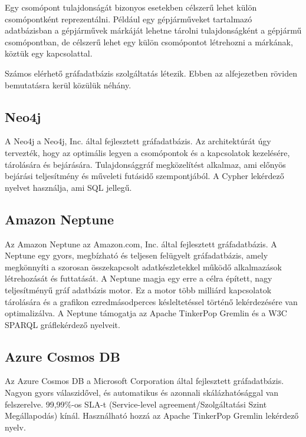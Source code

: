 \bigskip

Egy csomópont tulajdonságát bizonyos esetekben célszerű lehet külön csomópontként reprezentálni. Például egy gépjárműveket tartalmazó adatbázisban a gépjárművek márkáját lehetne tárolni tulajdonságként a gépjármű csomópontban, de célszerű lehet egy külön csomópontot létrehozni a márkának, köztük egy kapcsolattal.


Számos elérhető gráfadatbázis szolgáltatás létezik. Ebben az alfejezetben röviden bemutatásra kerül közülük néhány.

\subsection{Neo4j}
A Neo4j a Neo4j, Inc. által fejlesztett gráfadatbázis. \cite{neo4j} Az architektúrát úgy tervezték, hogy az optimális legyen a csomópontok és a kapcsolatok kezelésére, tárolására és bejárására. Tulajdonsággráf megközelítést alkalmaz, ami előnyös bejárási teljesítmény és műveleti futásidő szempontjából. A Cypher lekérdező nyelvet használja, ami SQL jellegű.

\subsection{Amazon Neptune}
Az Amazon Neptune az Amazon.com, Inc. által fejlesztett gráfadatbázis. \cite{neptune} A Neptune egy gyors, megbízható és teljesen felügyelt gráfadatbázis, amely megkönnyíti a szorosan összekapcsolt adatkészletekkel működő alkalmazások létrehozását és futtatását. A Neptune magja egy erre a célra épített, nagy teljesítményű gráf adatbázis motor. Ez a motor több milliárd kapcsolatok tárolására és a grafikon ezredmásodperces késleltetéssel történő lekérdezésére van optimalizálva. A Neptune támogatja az Apache TinkerPop Gremlin és a W3C SPARQL gráflekérdező nyelveit.

\subsection{Azure Cosmos DB}
Az Azure Cosmos DB a Microsoft Corporation által fejlesztett gráfadatbázis. \cite{azure} Nagyon gyors válaszidővel, és automatikus és azonnali skálázhatósággal van felszerelve. 99,99\%-os SLA-t (Service-level agreement/Szolgáltatási Szint Megállapodás) kínál. Használható hozzá az Apache TinkerPop Gremlin lekérdező nyelv. 

